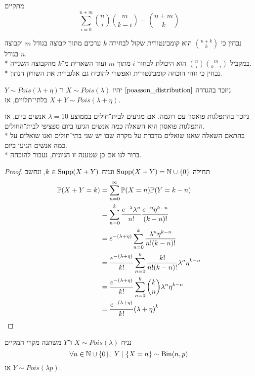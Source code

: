 \begin{exercise}
	מתקיים
	\[
		\sum_{i = 0}^{n + m} \binom{n}{i} \binom{m}{k - i}
		= \binom{n + m}{k}
	\]
\end{exercise}
\begin{solution}
	נבחין כי $\binom{n + k}{k}$ הוא קומבינטורית שקול לבחירה $k$ ערכים מתוך קבוצה בגודל $m$ וקבוצה בגודל $n$. \\*
	במקביל $\binom{n}{i} \binom{m}{k - i}$ הוא היכולת לבחור $i$ מתוך $m$ ועוד השארית מ־$k$ מהקבוצה השנייה. \\*
	נבחין כי זוהי הוכחה קומבינטורית ואפשרי להוכיח גם אלגברית את השוויון הנתון.
\end{solution}
\begin{proposition}
	ניזכר בהגדרה $\ref{poasson_distribution}$ יהיו $X \sim Pois(\lambda)$ ו־$Y \sim Pois(\lambda + \eta)$ בלתי־תלויים, אז $X + Y \sim Pois(\lambda + \eta)$.
\end{proposition}
ניזכר בהתפלגות פואסון עם דוגמה.
אם מגיעים לבית־חולים בממוצע $\lambda = 10$ אנשים ביום, אז התפלגות פואסון היא השאלה כמה אנשים הגיעו ביום ספציפי לבית־החולים. \\*
בהתאם השאלה שאנו שואלים מדברת על מקרה שבו יש שני בתי־חולים ואנו שואלים על כמה אנשים הגיעו ביום. \\*
ברור לנו אם כן שטענה זו הגיונית, נעבור להוכחה.
\begin{proof}
	תחילה $\operatorname{Supp}(X + Y) = \mathbb{N} \cup \{0\}$ ונניח $k \in \operatorname{Supp}(X + Y)$, ונחשב
	\begin{align*}
		\mathbb{P}(X + Y = k)
		& = \sum_{n = 0}^{\infty} \mathbb{P}(X = n) \mathbb{P}(Y = k - n) \\
		& = \sum_{n = 0}^{k} \frac{e^{-\lambda} \lambda^n}{n!} \frac{e^{-\eta} \eta^{k - n}}{(k - n)!} \\
		& = e^{-(\lambda + \eta)} \sum_{n = 0}^{k} \frac{\lambda^n \eta^{k - n}}{n! (k - n)!} \\
		& = \frac{e^{-(\lambda + \eta)}}{k!} \sum_{n = 0}^{k} \frac{k!}{n! (k - n)!} \lambda^n \eta^{k - n} \\
		& = \frac{e^{-(\lambda + \eta)}}{k!} \sum_{n = 0}^{k} \binom{k}{n} \lambda^n \eta^{k - n} \\
		& = \frac{e^{-(\lambda + \eta)}}{k!} {(\lambda + \eta)}^k
	\end{align*}
\end{proof}
\begin{proposition}
	נניח $X \sim Pois(\lambda)$ ו־$Y$ משתנה מקרי המקיים
	\[
		\forall n \in \mathbb{N} \cup \{0\},\ Y \mid \{X = n\} \sim \operatorname{Bin}(n, p)
	\]
	אז $Y \sim Pois(\lambda p)$.
\end{proposition}

